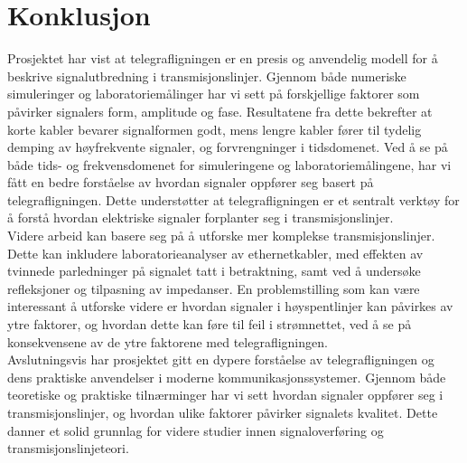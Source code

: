 \section{Konklusjon}
Prosjektet har vist at telegrafligningen er en presis og anvendelig modell for å beskrive signalutbredning i transmisjonslinjer. Gjennom både numeriske simuleringer og laboratoriemålinger har vi sett på forskjellige faktorer som påvirker signalers form, amplitude og fase. Resultatene fra dette bekrefter at korte kabler bevarer signalformen godt, mens lengre kabler fører til tydelig demping av høyfrekvente signaler, og forvrengninger i tidsdomenet. Ved å se på både tids- og frekvensdomenet for simuleringene og laboratoriemålingene, har vi fått en bedre forståelse av hvordan signaler oppfører seg basert på telegrafligningen. Dette understøtter at telegrafligningen er et sentralt verktøy for å forstå hvordan elektriske signaler forplanter seg i transmisjonslinjer.
\\[1em]
Videre arbeid kan basere seg på å utforske mer komplekse transmisjonslinjer. Dette kan inkludere laboratorieanalyser av ethernetkabler, med effekten av tvinnede parledninger på signalet tatt i betraktning, samt ved å undersøke refleksjoner og tilpasning av impedanser. En problemstilling som kan være interessant å utforske videre er hvordan signaler i høyspentlinjer kan påvirkes av ytre faktorer, og hvordan dette kan føre til feil i strømnettet, ved å se på konsekvensene av de ytre faktorene med telegrafligningen.
\\[1em]
Avslutningsvis har prosjektet gitt en dypere forståelse av telegrafligningen og dens praktiske anvendelser i moderne kommunikasjonssystemer. Gjennom både teoretiske og praktiske tilnærminger har vi sett hvordan signaler oppfører seg i transmisjonslinjer, og hvordan ulike faktorer påvirker signalets kvalitet. Dette danner et solid grunnlag for videre studier innen signaloverføring og transmisjonslinjeteori.